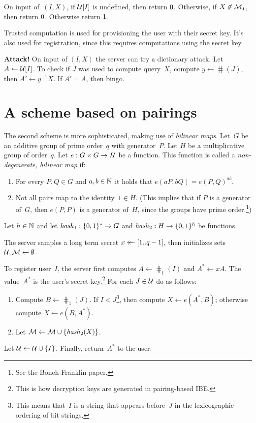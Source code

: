 \documentclass{build/llncs}
\begin{document}
%
On input of~$(I, X)$, if $\mathcal{U}[I]$ is undefined, then return $0$.
%
Otherwise, if $X \not\in \mathcal{M}_I$, then return $0$.
%
Otherwise return $1$.

%
Trusted computation is used for provisioning the user with their secret key.
It's also used for registration, since this requires computations using the
secret key.

\noindent\textbf{\color{red}Attack!}
%
On input of $(I, X)$ the server can try a dictionary attack. Let $A \gets
\mathcal{U}[I]$. To check if $J$ was used to compute query~$X$, compute $y \gets \hash(J)$, then
$A' \gets y^{-1}X$. If $A' = A$, then bingo.

\newpage
\section*{A scheme based on pairings}

The second scheme is more sophisticated, making use of \emph{bilinear maps}.
%
Let~$G$ be an additive group of prime order~$q$ with generator~$P$.
%
Let $H$ be a multiplicative group of order~$q$.
%
Let $e : G \times G \to H$ be a function. This function is called a \emph{non-degenerate, bilinear map}
if:
\begin{enumerate}
  \item For every $P, Q \in G$ and $a, b \in \mathbb{N}$ it holds that $e(aP, bQ) = e(P,
    Q)^{ab}$.
  \item Not all pairs map to the identity~$1\in H$. (This implies that if $P$ is
    a generator of~$G$, then $e(P, P)$ is a generator of~$H$, since the
    groups have prime order.\footnote{See the Boneh-Franklin paper.})
\end{enumerate}
%
Let $h\in\mathbb{N}$ and let $\mathit{hash}_1 : \{0,1\}^* \to G$ and $\mathit{hash}_2 : H \to
\{0,1\}^h$ be functions.

%
The server samples a long term secret $x \mathrel{\leftarrow\mkern-14mu\leftarrow} [1..q-1]$, then
initializes sets~$\mathcal{U}, \mathcal{M} \gets \emptyset$.

%
To register user~$I$, the server first computes $A \gets \hash_1(I)$ and $A^*
\gets xA$. The value~$A^*$ is the user's secret key.\footnote{This is how
decryption keys are generated in pairing-based IBE.}
%
For each $J \in \mathcal{U}$ do as follows:
%
\begin{enumerate}
  \item Compute $B \gets \hash_1(J)$. If $I < J$\footnote{This means that~$I$ is a
    string that appears before~$J$ in the lexicographic ordering of bit
    strings.}, then compute $X \gets e(A^*, B)$; otherwise compute $X \gets e(B,
    A^*)$.
  \item Let $\mathcal{M} \gets \mathcal{M} \cup \{\mathit{hash}_2(X)\}$.
\end{enumerate}
%
Let $\mathcal{U} \gets \mathcal{U} \cup \{I\}$.
%
Finally, return~$A^*$ to the user.
\end{document}
